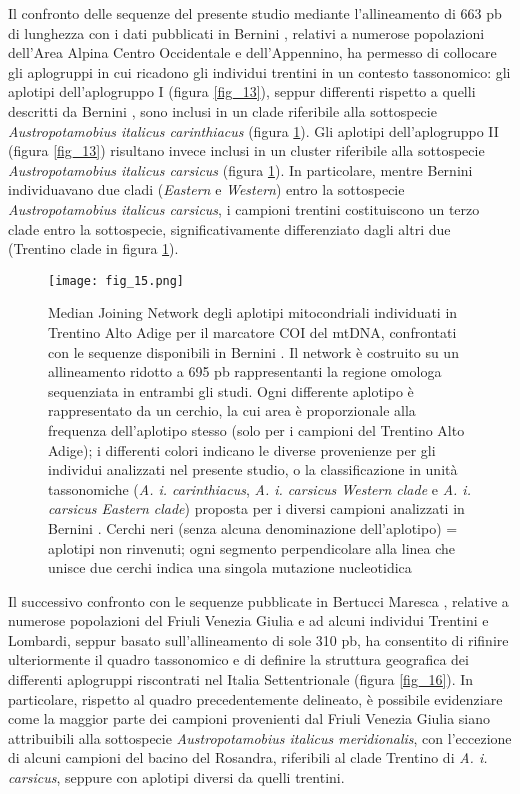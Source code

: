 \documentclass[11pt,a4paper,italian,twoside,openany]{memoir}
\begin{document}
Il confronto delle sequenze del presente studio mediante l'allineamento di 663 pb di lunghezza con i dati pubblicati in Bernini \cite{Bernini 2016}, relativi a numerose popolazioni dell'Area Alpina Centro Occidentale e dell'Appennino, ha permesso di collocare gli aplogruppi in cui ricadono gli individui trentini in un contesto tassonomico: gli aplotipi dell'aplogruppo I (figura \ref{fig_13}), seppur differenti rispetto a quelli descritti da Bernini \cite{Bernini 2016}, sono inclusi in un clade riferibile alla sottospecie \emph{Austropotamobius italicus carinthiacus} (figura \ref{fig_15}). Gli aplotipi dell'aplogruppo II (figura \ref{fig_13}) risultano invece inclusi in un cluster riferibile alla sottospecie \emph{Austropotamobius italicus carsicus} (figura \ref{fig_15}). In particolare, mentre Bernini \cite{Bernini 2016} individuavano due cladi (\emph{Eastern} e \emph{Western}) entro la sottospecie \emph{Austropotamobius italicus carsicus}, i campioni trentini costituiscono un terzo clade entro la sottospecie, significativamente differenziato dagli altri due (Trentino clade in figura \ref{fig_15}).
\newpage

\begin{figure}[H]
  \centering
  \texttt{[image: fig\_15.png]}
  \caption{Median Joining Network degli aplotipi mitocondriali individuati in Trentino Alto Adige per il marcatore COI del mtDNA, confrontati con le sequenze disponibili in Bernini \protect\cite{Bernini 2016}. Il network è costruito su un allineamento ridotto a 695 pb rappresentanti la regione omologa sequenziata in entrambi gli studi. Ogni differente aplotipo è rappresentato da un cerchio, la cui area è proporzionale alla frequenza dell'aplotipo stesso (solo per i campioni del Trentino Alto Adige); i differenti colori indicano le diverse provenienze per gli individui analizzati nel presente studio, o la classificazione in unità tassonomiche (\emph{A. i. carinthiacus}, \emph{A. i. carsicus Western clade} e \emph{A. i. carsicus Eastern clade}) proposta per i diversi campioni analizzati in Bernini \protect\cite{Bernini 2016}. Cerchi neri (senza alcuna denominazione dell'aplotipo) = aplotipi non rinvenuti; ogni segmento perpendicolare alla linea che unisce due cerchi indica una singola mutazione nucleotidica}
  \label{fig_15}
\end{figure}

Il successivo confronto con le sequenze pubblicate in Bertucci Maresca \cite{Bertucci Maresca 2015}, relative a numerose popolazioni del Friuli Venezia Giulia e ad alcuni individui Trentini e Lombardi, seppur basato sull'allineamento di sole 310 pb, ha consentito di rifinire ulteriormente il quadro tassonomico e di definire la struttura geografica dei differenti aplogruppi riscontrati nel Italia Settentrionale (figura \ref{fig_16}). In particolare, rispetto al quadro precedentemente delineato, è possibile evidenziare come la maggior parte dei campioni provenienti dal Friuli Venezia Giulia siano attribuibili alla sottospecie \emph{Austropotamobius italicus meridionalis}, con l'eccezione di alcuni campioni del bacino del Rosandra, riferibili al clade Trentino di \emph{A. i. carsicus}, seppure con aplotipi diversi da quelli trentini. 
\end{document}
